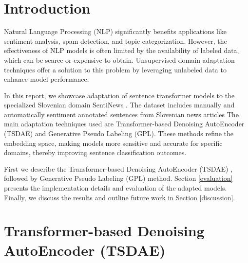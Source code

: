 \documentclass[fleqn,moreauthors,10pt]{ds_report}
\affiliation{\textit{Advisors: Boshko Koloski}}
\begin{document}
\flushbottom 

\maketitle 

\thispagestyle{empty} 


\section*{Introduction}

Natural Language Processing (NLP) significantly benefits applications like sentiment analysis, spam detection, and topic categorization.
However, the effectiveness of NLP models is often limited by the availability of labeled data, which can be scarce or expensive to obtain. 
Unsupervised domain adaptation techniques offer a solution to this problem by leveraging unlabeled data to enhance model performance.

In this report, we showcase adaptation of sentence transformer models to the specialized Slovenian domain SentiNews \cite{senti_news}.
The dataset includes manually and automatically sentiment annotated sentences from Slovenian news articles
The main adaptation techniques used are Transformer-based Denoising AutoEncoder (TSDAE) and Generative Pseudo Labeling (GPL).
These methods refine the embedding space, making models more sensitive and accurate for specific domains, thereby improving sentence classification outcomes.

First we describe the Transformer-based Denoising AutoEncoder (TSDAE) \cite{tsdae}, followed by Generative Pseudo Labeling (GPL) \cite{gpl} method.
Section \ref{evaluation} presents the implementation details and evaluation of the adapted models.
Finally, we discuss the results and outline future work in Section \ref{discussion}.






\section*{Transformer-based Denoising AutoEncoder (TSDAE)}
\end{document}
